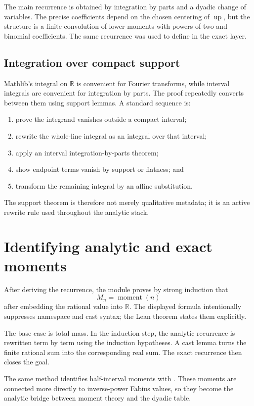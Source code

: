 \documentclass[11pt,oneside]{report}
\theoremstyle{definition}
\theoremstyle{remark}
\DeclareRobustCommand{\lean}[1]{\texorpdfstring{\texttt{\expandafter\seqsplit\expandafter{\detokenize{#1}}}}{\detokenize{#1}}}
\newcommand{\upf}{\operatorname{up}}
\newcommand{\R}{\mathbb{R}}
\begin{document}
The main recurrence is obtained by integration by parts and a dyadic change of variables.  The precise coefficients depend on the chosen centering of \(\upf\), but the structure is a finite convolution of lower moments with powers of two and binomial coefficients.  The same recurrence was used to define \lean{moment} in the exact layer.

\subsection{Integration over compact support}
Mathlib's integral on \(\R\) is convenient for Fourier transforms, while interval integrals are convenient for integration by parts.  The proof repeatedly converts between them using support lemmas.  A standard sequence is:
\begin{enumerate}
  \item prove the integrand vanishes outside a compact interval;
  \item rewrite the whole-line integral as an integral over that interval;
  \item apply an interval integration-by-parts theorem;
  \item show endpoint terms vanish by support or flatness; and
  \item transform the remaining integral by an affine substitution.
\end{enumerate}
The support theorem is therefore not merely qualitative metadata; it is an active rewrite rule used throughout the analytic stack.

\section{Identifying analytic and exact moments}
After deriving the recurrence, the module proves by strong induction that
\[
  M_n=\operatorname{moment}(n)
\]
after embedding the rational value into \(\R\).  The displayed formula intentionally suppresses namespace and cast syntax; the Lean theorem states them explicitly.

The base case is total mass.  In the induction step, the analytic recurrence is rewritten term by term using the induction hypotheses.  A cast lemma turns the finite rational sum into the corresponding real sum.  The exact recurrence then closes the goal.

The same method identifies half-interval moments with \lean{halfMoment}.  These moments are connected more directly to inverse-power Fabius values, so they become the analytic bridge between moment theory and the dyadic table.
\end{document}
